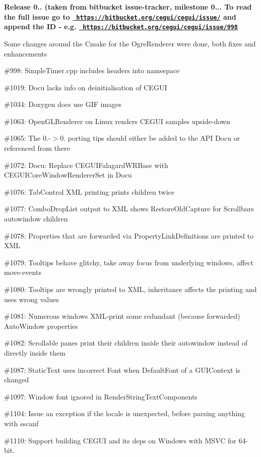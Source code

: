 {\bfseries{Release 0.. (taken from bitbucket issue-\/tracker, milestone 0... To read the full issue go to \href{https://bitbucket.org/cegui/cegui/issue/}{\texttt{ https\+://bitbucket.\+org/cegui/cegui/issue/}} and append the ID -\/ e.\+g. \href{http://example.net/}{\texttt{ https\+://bitbucket.\+org/cegui/cegui/issue/998}} }}
\begin{DoxyItemize}
\item Some changes around the Cmake for the Ogre\+Renderer were done, both fixes and enhancements
\item \#998\+: Simple\+Timer.\+cpp includes headers into namespace
\item \#1019\+: Docu lacks info on deinitialisation of C\+E\+G\+UI
\item \#1034\+: Doxygen docs use G\+IF images
\item \#1063\+: Open\+G\+L\+Renderer on Linux renders C\+E\+G\+UI samples upside-\/down
\item \#1065\+: The 0.-\/$>$0. porting tips should either be added to the A\+PI Docu or referenced from there
\item \#1072\+: Docu\+: Replace C\+E\+G\+U\+I\+Falagard\+W\+R\+Base with C\+E\+G\+U\+I\+Core\+Window\+Renderer\+Set in Docu
\item \#1076\+: Tab\+Control X\+ML printing prints children twice
\item \#1077\+: Combo\+Drop\+List output to X\+ML shows Restore\+Old\+Capture for Scrollbar\textquotesingle{}s autowindow children
\item \#1078\+: Properties that are forwarded via Property\+Link\+Definitions are printed to X\+ML
\item \#1079\+: Tooltips behave glitchy, take away focus from underlying windows, affect move-\/events
\item \#1080\+: Tooltips are wrongly printed to X\+ML, inheritance affects the printing and uses wrong values
\item \#1081\+: Numerous windows X\+M\+L-\/print some redundant (because forwarded) Auto\+Window properties
\item \#1082\+: Scrollable panes print their children inside their autowindow instead of directly inside them
\item \#1087\+: Static\+Text uses incorrect Font when Default\+Font of a G\+U\+I\+Context is changed
\item \#1097\+: Window font ignored in Render\+String\+Text\+Components
\item \#1104\+: Issue an exception if the locale is unexpected, before parsing anything with sscanf
\item \#1110\+: Support building C\+E\+G\+UI and its deps on Windows with M\+S\+VC for 64-\/bit.
\end{DoxyItemize}

